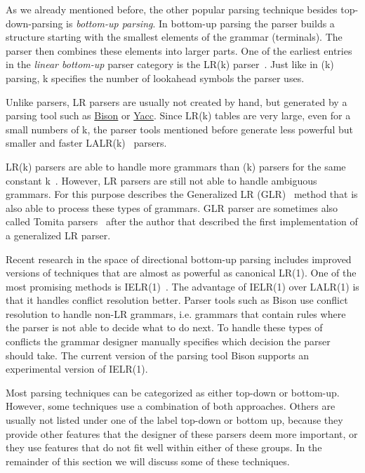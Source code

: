 As we already mentioned before, the other popular parsing technique besides top-down-parsing is \emph{bottom-up parsing}. In bottom-up parsing the parser builds a structure starting with the smallest elements of the grammar (terminals). The parser then combines these elements into larger parts. One of the earliest entries in the \emph{linear bottom-up} parser category is the LR(k) parser~\cite{knuth1965translation}. Just like in (k) parsing, k specifies the number of lookahead symbols the parser uses.

\begin{sloppypar}
Unlike  parsers, LR parsers are usually not created by hand, but generated by a parsing tool such as \href{https://www.gnu.org/software/bison}{Bison} or \href{http://dinosaur.compilertools.net/yacc}{Yacc}. Since LR(k) tables are very large, even for a small numbers of k, the parser tools mentioned before generate less powerful but smaller and faster LALR(k)~\cite{deremer1969practical} parsers.
\end{sloppypar}

LR(k) parsers are able to handle more grammars than (k) parsers for the same constant k~\cite[section “Lookahead”]{haberman2013ll}. However, LR parsers are still not able to handle ambiguous grammars. For this purpose \citeauthor{lang1974deterministic} describes the Generalized LR (GLR)~\cite{lang1974deterministic} method that is also able to process these types of grammars. GLR parser are sometimes also called Tomita parsers~\cite{tomita1985efficient} after the author that described the first implementation of a generalized LR parser.

Recent research in the space of directional bottom-up parsing includes improved versions of techniques that are almost as powerful as canonical LR(1). One of the most promising methods is IELR(1)~\cite{denny2008ielr}. The advantage of IELR(1) over LALR(1) is that it handles conflict resolution better. Parser tools such as Bison use conflict resolution to handle non-LR grammars, i.e. grammars that contain rules where the parser is not able to decide what to do next. To handle these types of conflicts the grammar designer manually specifies which decision the parser should take. The current version of the parsing tool Bison supports an experimental version of IELR(1).

Most parsing techniques can be categorized as either top-down or bottom-up. However, some techniques use a combination of both approaches. Others are usually not listed under one of the label top-down or bottom up, because they provide other features that the designer of these parsers deem more important, or they use features that do not fit well within either of these groups. In the remainder of this section we will discuss some of these techniques.

